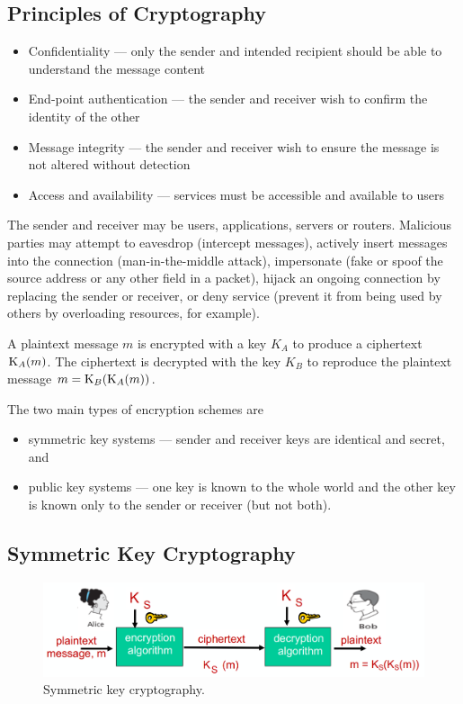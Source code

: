 \subsection{Principles of Cryptography}

\begin{itemize}
  \item Confidentiality --- only the sender and intended recipient should be able to understand the message content
  \item End-point authentication --- the sender and receiver wish to confirm the identity of the other
  \item Message integrity --- the sender and receiver wish to ensure the message is not altered without detection
  \item Access and availability --- services must be accessible and available to users
\end{itemize}

The sender and receiver may be users, applications, servers or routers.
Malicious parties may attempt to eavesdrop (intercept messages), actively insert messages into the connection (man-in-the-middle attack), impersonate (fake or spoof the source address or any other field in a packet), hijack an ongoing connection by replacing the sender or receiver, or deny service (prevent it from being used by others by overloading resources, for example).

A plaintext message \(m\) is encrypted with a key \(K_A\) to produce a ciphertext \(\textup{K}_{A}\!\left( m \right)\).
The ciphertext is decrypted with the key \(K_B\) to reproduce the plaintext message \(m = \textup{K}_{B}\!\left( \textup{K}_{A}\!\left( m \right) \right)\).

The two main types of encryption schemes are
\begin{itemize}
  \item symmetric key systems --- sender and receiver keys are identical and secret, and
  \item public key systems --- one key is known to the whole world and the other key is known only to the sender or receiver (but not both).
\end{itemize}

\subsection{Symmetric Key Cryptography}

\begin{figure}[htp]
  \centering
  \includegraphics[width=12cm]{unit-20/figures/alice-bob-symmetric.png}
  \caption*{Symmetric key cryptography.}
\end{figure}

